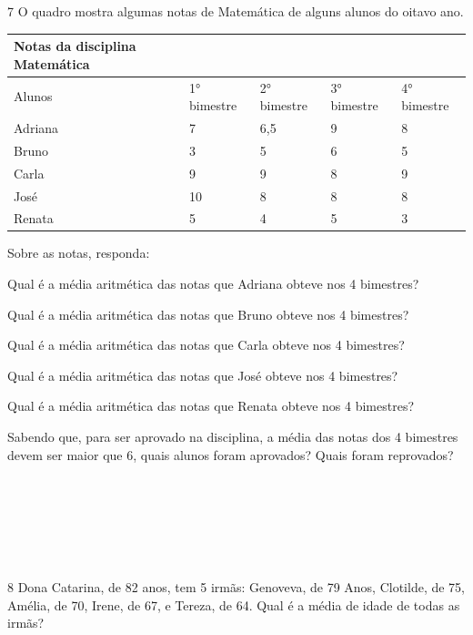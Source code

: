 {{\pagebreak

\num{7} O quadro mostra algumas notas de Matemática de alguns alunos do oitavo ano.


\begin{longtable}[]{@{}lllll@{}}
\toprule
Notas da disciplina Matemática & & & &\tabularnewline
\midrule
\endhead
Alunos & 1° bimestre & 2° bimestre & 3° bimestre & 4°
bimestre\tabularnewline
Adriana & 7 & 6,5 & 9 & 8\tabularnewline
Bruno & 3 & 5 & 6 & 5\tabularnewline
Carla & 9 & 9 & 8 & 9\tabularnewline
José & 10 & 8 & 8 & 8\tabularnewline
Renata & 5 & 4 & 5 & 3\tabularnewline
\bottomrule
\end{longtable}

Sobre as notas, responda:

\begin{escolha}
\item Qual é a média aritmética das notas que Adriana obteve nos 4
bimestres?
\item Qual é a média aritmética das notas que Bruno obteve nos 4 bimestres?
\item Qual é a média aritmética das notas que Carla obteve nos 4 bimestres?
\item Qual é a média aritmética das notas que José obteve nos 4 bimestres?
\item Qual é a média aritmética das notas que Renata obteve nos 4
bimestres?
\item Sabendo que, para ser aprovado na disciplina, a média das notas dos 4
bimestres devem ser maior que 6, quais alunos foram aprovados? Quais
foram reprovados?
\end{escolha}

\\
\\
\\
\\
\\

\num{8} Dona Catarina, de 82 anos, tem 5 irmãs: Genoveva, de 79 Anos,
Clotilde, de 75, Amélia, de 70, Irene, de 67, e Tereza, de 64. Qual é a
média de idade de todas as irmãs?

}}
